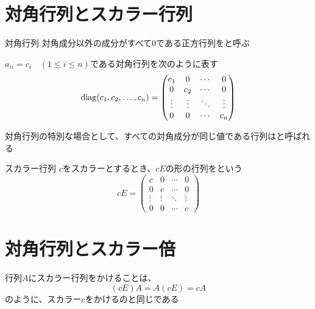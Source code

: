 \documentclass[../../../topic_linear-algebra]{subfiles}
\begin{document}
\sectionline
\section{対角行列とスカラー行列}

\begin{definition}{対角行列}
  対角成分以外の成分がすべて0である正方行列をと呼ぶ

  $a_{ii} = c_i \quad (1 \leq i \leq n)$である対角行列を次のように表す
  \begin{equation*}
    \operatorname{diag}(c_1, c_2, \ldots, c_n) = \begin{pmatrix}
      c_1    & 0      & \cdots & 0      \\
      0      & c_2    & \cdots & 0      \\
      \vdots & \vdots & \ddots & \vdots \\
      0      & 0      & \cdots & c_n
    \end{pmatrix}
  \end{equation*}
\end{definition}

\br

対角行列の特別な場合として、すべての対角成分が同じ値である行列はと呼ばれる

\begin{definition}{スカラー行列}
  $c$をスカラーとするとき、$cE$の形の行列をという
  \begin{equation*}
    cE = \begin{pmatrix}
      c      & 0      & \cdots & 0      \\
      0      & c      & \cdots & 0      \\
      \vdots & \vdots & \ddots & \vdots \\
      0      & 0      & \cdots & c
    \end{pmatrix}
  \end{equation*}
\end{definition}

\sectionline
\section{対角行列とスカラー倍}

行列$A$にスカラー行列をかけることは、
\begin{equation*}
  (cE)A = A(cE) = cA
\end{equation*}
のように、スカラー$c$をかけるのと同じである
\end{document}
